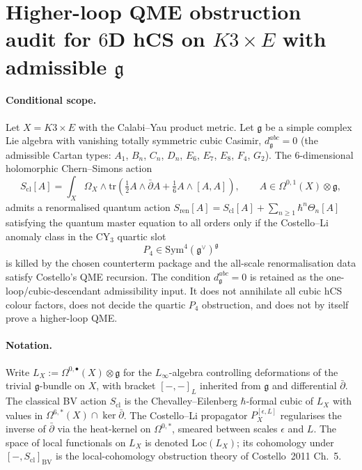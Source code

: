 \documentclass[11pt]{amsart}
\theoremstyle{definition}
\theoremstyle{remark}
\providecommand{\frakg}{\mathfrak{g}}
\providecommand{\Sym}{\mathrm{Sym}}
\providecommand{\Loc}{\mathrm{Loc}}
\providecommand{\BV}{\mathrm{BV}}
\providecommand{\dbar}{\bar\partial}
\providecommand{\tr}{\mathrm{tr}}
\begin{document}
\section*{Higher-loop QME obstruction audit for $6$D hCS on $K3 \times E$ with admissible
$\frakg$}

\paragraph{Conditional scope.}
Let $X = K3 \times E$ with the Calabi--Yau product metric. Let $\frakg$
be a simple complex Lie algebra with vanishing totally symmetric cubic
Casimir, $d^{abc}_\frakg = 0$ (the admissible Cartan types: $A_1$,
$B_n$, $C_n$, $D_n$, $E_6$, $E_7$, $E_8$, $F_4$, $G_2$). The
$6$-dimensional holomorphic Chern--Simons action
\[
  S_{\mathrm{cl}}[A] = \int_X \Omega_X \wedge
  \tr\!\left(\tfrac{1}{2}A \wedge \dbar A
  + \tfrac{1}{6} A \wedge [A, A]\right),
  \qquad A \in \Omega^{0, 1}(X) \otimes \frakg,
\]
admits a renormalised quantum action
\(S_{\mathrm{ren}}[A] = S_{\mathrm{cl}}[A] + \sum_{n \geq 1} \hbar^n
\Theta_n[A]\)
satisfying the quantum master equation to all orders only if the
Costello--Li anomaly class in the CY$_3$ quartic slot
\[
  P_4 \in \Sym^4(\frakg^\vee)^\frakg
\]
is killed by the chosen counterterm package and the all-scale
renormalisation data satisfy Costello's QME recursion. The condition
$d^{abc}_\frakg=0$ is retained as the one-loop/cubic-descendant
admissibility input. It does not annihilate all cubic hCS colour
factors, does not decide the quartic $P_4$ obstruction, and does not
by itself prove a higher-loop QME.

\paragraph{Notation.}
Write $L_X := \Omega^{0, \bullet}(X) \otimes \frakg$ for the
$L_\infty$-algebra controlling deformations of the trivial $\frakg$-bundle
on $X$, with bracket $[-, -]_L$ inherited from $\frakg$ and differential
$\dbar$. The classical BV action $S_{\mathrm{cl}}$ is the Chevalley--Eilenberg
$\hbar$-formal cubic of $L_X$ with values in
$\Omega^{6, *}(X) \cap \ker \dbar$. The Costello--Li propagator
$P_X^{[\epsilon, L]}$ regularises the inverse of $\dbar$ via the heat-kernel
on $\Omega^{0, *}$, smeared between scales $\epsilon$ and $L$. The space
of local functionals on $L_X$ is denoted $\Loc(L_X)$; its cohomology
under $[-, S_{\mathrm{cl}}]_\BV$ is the local-cohomology obstruction theory
of Costello~2011 Ch.~5.
\end{document}
